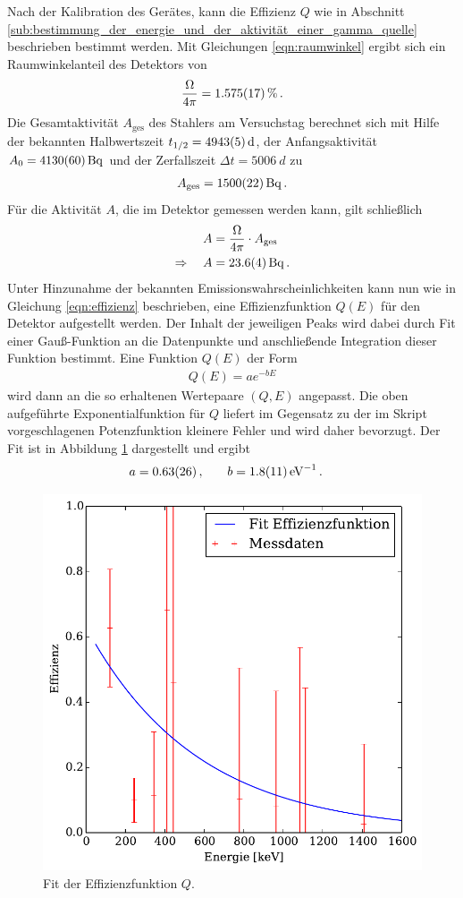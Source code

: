 Nach der Kalibration des Gerätes, kann die Effizienz $Q$ wie in Abschnitt
\ref{sub:bestimmung_der_energie_und_der_aktivität_einer_gamma_quelle}
beschrieben bestimmt werden. Mit Gleichungen \eqref{eqn:raumwinkel} ergibt
sich ein Raumwinkelanteil des Detektors von
\begin{align*}
    \frac{\Omega}{4\pi} = \SI{1.575+-0.017}{\percent}\,.
\end{align*}
Die Gesamtaktivität $A_\text{ges}$ des Stahlers am Versuchstag berechnet
sich mit Hilfe der bekannten Halbwertszeit $t_{1/2} = \SI{4943+-5}{d}$, der
Anfangsaktivität $A_0 = \SI{4130+-60}{\becquerel}$ und der Zerfallszeit $\Delta
t = \SI{5006}{d}$ zu
\begin{align*}
    A_\text{ges} = \SI{1500+-22}{\becquerel}\,.
\end{align*}
Für die Aktivität $A$, die im Detektor gemessen werden kann, gilt schließlich
\begin{align*}
    A &= \frac{\Omega}{4\pi}\cdot A_\text{ges}\,\\
    \Rightarrow \quad A &= \SI{23.6+-0.4}{\becquerel}\,.
\end{align*}
Unter Hinzunahme der bekannten Emissionswahrscheinlichkeiten kann nun wie
in Gleichung \eqref{eqn:effizienz} beschrieben, eine Effizienzfunktion $Q(E)$
für den Detektor aufgestellt werden.
Der Inhalt der jeweiligen Peaks wird dabei durch Fit einer Gauß-Funktion
an die Datenpunkte und anschließende Integration dieser Funktion bestimmt.
Eine Funktion $Q(E)$ der Form
\begin{align*}
    Q(E) = ae^{-bE}
\end{align*}
wird dann an die so erhaltenen Wertepaare $(Q,E)$ angepasst.
Die oben aufgeführte Exponentialfunktion für $Q$ liefert im Gegensatz
zu der im Skript vorgeschlagenen Potenzfunktion kleinere Fehler
und wird daher bevorzugt.
Der Fit ist in Abbildung \ref{fig:efficiency_fit} dargestellt und ergibt
\begin{align*}
    a &= \num{0.63+-0.26}\,, &\quad b &= \SI{1.8+-1.1}{eV^{-1}}\,.
\end{align*}
\begin{figure}[htb]
    \centering
    \includegraphics[width=0.7\linewidth]{img/05_efficiencies.pdf}
    \caption{
        Fit der Effizienzfunktion $Q$.
    }
    \label{fig:efficiency_fit}
\end{figure}

